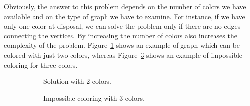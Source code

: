 Obviously, the answer to this problem depends on the number of colors we have available and on the type of graph we have to examine. For instance, if we have only one color at disposal, we can solve the problem only if there are no edges connecting the vertices. By increasing the number of colors also increases the complexity of the problem. Figure~\ref{2colors} shows an example of graph which can be colored with just two colors, whereas Figure~\ref{3colors} shows an example of impossible coloring for three colors.
\begin{figure}[h!t]
\centering
\begin{subfigure}[ht]{0.48\textwidth}
	\centering
	\caption{Solution with 2 colors.}\label{2colors}
\end{subfigure}
\begin{subfigure}[ht]{0.48\textwidth}
	\centering
        \caption{Impossible coloring with 3 colors.}\label{3colors}
\end{subfigure}
\caption{}
\end{figure}

